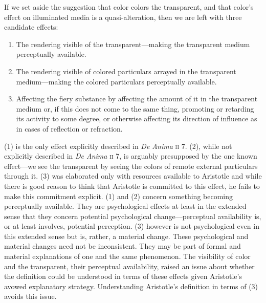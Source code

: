 If we set aside the suggestion that color colors the transparent, and that color's effect on illuminated media is a quasi-alteration, then we are left with three candidate effects:
\begin{enumerate}[(1)]
	\item The rendering visible of the transparent---making the transparent medium perceptually available.
	\item The rendering visible of colored particulars arrayed in the transparent medi\-um\----\-making the colored particulars perceptually available. 
	\item Affecting the fiery substance by affecting the amount of it in the transparent medium or, if this does not come to the same thing, promoting or retarding its activity to some degree, or otherwise affecting its direction of influence as in cases of reflection or refraction. 
\end{enumerate}
(1) is the only effect explicitly described in \emph{De Anima} \textsc{ii} 7. (2), while not explicitly described in \emph{De Anima} \textsc{ii} 7, is arguably presupposed by the one known effect---we see the transparent by seeing the colors of remote external particulars through it. (3) was elaborated only with resources available to Aristotle and while there is good reason to think that Aristotle is committed to this effect, he fails to make this commitment explicit. (1) and (2) concern something becoming perceptually available. They are psychological effects at least in the extended sense that they concern potential psychological change---perceptual availability is, or at least involves, potential perception. (3) however is not psychological even in this extended sense but is, rather, a material change. These psychological and material changes need not be inconsistent. They may be part of formal and material explanations of one and the same phenomenon. The visibility of color and the transparent, their perceptual availability, raised an issue about whether the definition could be understood in terms of these effects given Aristotle's avowed explanatory strategy. Understanding Aristotle's definition in terms of (3) avoids this issue. 

